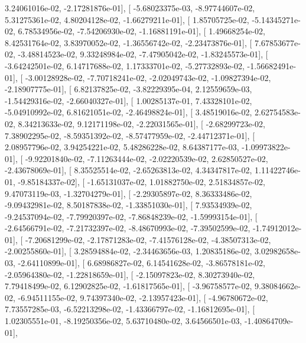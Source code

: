 \documentclass{article}
\begin{document}
          3.24061016e-02,  -2.17281876e-01],
       [ -5.68023375e-03,  -8.97744607e-02,   5.31275361e-02,
          4.80204128e-02,  -1.66279211e-01],
       [  1.85705725e-02,  -5.14345271e-02,   6.78534956e-02,
         -7.54206930e-02,  -1.16881191e-01],
       [  1.49668254e-02,   8.42531764e-02,   3.83970052e-02,
         -1.36556742e-02,  -2.23473876e-01],
       [  7.67853677e-02,  -3.48814523e-02,   9.33248984e-02,
         -7.47905042e-02,  -1.83245573e-01],
       [ -3.64242501e-02,   6.14717688e-02,   1.17333701e-02,
         -5.27732893e-02,  -1.56682491e-01],
       [ -3.00128928e-02,  -7.70718241e-02,  -2.02049743e-02,
         -1.09827394e-02,  -2.18907775e-01],
       [  6.82137825e-02,  -3.82229395e-04,   2.12559659e-03,
         -1.54429316e-02,  -2.66040327e-01],
       [  1.00285137e-01,   7.43328101e-02,  -5.04910992e-02,
          6.81621051e-02,  -2.46498824e-01],
       [  3.48519016e-02,   2.62754583e-02,   8.34213633e-02,
          9.12171198e-02,  -2.22031565e-01],
       [ -2.68299723e-02,   7.38902295e-02,  -8.59351392e-02,
         -8.57477959e-02,  -2.44712371e-01],
       [  2.08957796e-02,   3.94254221e-02,   5.48286228e-02,
          8.64387177e-03,  -1.09973822e-01],
       [ -9.92201840e-02,  -7.11263444e-02,  -2.02220539e-02,
          2.62850527e-02,  -2.43678069e-01],
       [  8.35525514e-02,  -2.65263813e-02,   4.34347817e-02,
          1.11422746e-01,  -9.85184337e-02],
       [ -1.65131037e-02,   1.01882750e-02,   2.51834857e-02,
          9.47073119e-03,  -1.32704279e-01],
       [ -2.29305897e-02,   8.36333486e-02,  -9.09432981e-02,
          8.50187838e-02,  -1.33851030e-01],
       [  7.93534939e-02,  -9.24537094e-02,  -7.79920397e-02,
         -7.86848239e-02,  -1.59993154e-01],
       [ -2.64566791e-02,  -7.21732397e-02,  -8.48670993e-02,
         -7.39502599e-02,  -1.74912012e-01],
       [ -7.20681299e-02,  -2.17871283e-02,  -7.41576128e-02,
         -4.38507313e-02,  -2.00255860e-01],
       [  3.28594884e-02,  -2.34463656e-03,   1.20835186e-02,
          3.02982658e-03,  -2.64110899e-01],
       [  6.68986827e-02,   6.14541628e-02,  -3.86578181e-02,
         -2.05964380e-02,  -1.22818659e-01],
       [ -2.15097823e-02,   8.30273940e-02,   7.79418499e-02,
          6.12902825e-02,  -1.61817565e-01],
       [ -3.96758577e-02,   9.38084662e-02,  -6.94511155e-02,
          9.74397340e-02,  -2.13957423e-01],
       [ -4.96780672e-02,   7.73557285e-03,  -6.52213298e-02,
         -1.43366797e-02,  -1.16812695e-01],
       [  1.02305551e-01,  -8.19250356e-02,   5.63710480e-02,
          3.64566501e-03,  -1.40864709e-01],
\end{document}
